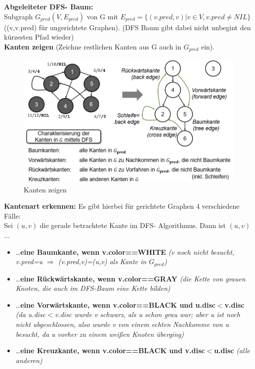 \documentclass{article}
\begin{document}
            \textbf{Abgeleiteter DFS- Baum:}\\
            Subgraph $G_{pred} (V, E_{pred})$ von G mit $E_{pred}=\{(v.pred, v)| v \in V, v.pred \neq NIL \}$ ((v,v.pred) für ungerichtete Graphen). (DFS Baum gibt dabei nicht unbegint den kürzesten Pfad wieder)\\
            \textbf{Kanten zeigen} (Zeichne restlichen Kanten aus G auch in $G_{pred}$ ein).
            \begin{figure}[ht]
                \centering
                \includegraphics[width=1\textwidth]{Bilder/DFSAbg.png}
                \caption{Kanten zeigen}
                \label{fig:DFSAbg}
            \end{figure}
            \newpage
            \textbf{Kantenart erkennen:} Es gibt hierbei für gerichtete Graphen 4 verschiedene Fälle:\\
            Sei $(u,v)$ die gerade betrachtete Kante im DFS- Algorithmus. Dann ist $(u,v)$...
            \begin{itemize}
                \item \dots\textbf{eine Baumkante, wenn v.color==WHITE} \textit{(v noch nicht besucht, v.pred=u $\Rightarrow$ (v.pred,v)=(u,v) als Kante in $G_{pred}$)}
                \item \dots\textbf{eine Rückwärtskante, wenn v.color==GRAY} \textit{(die Kette von grauen Knoten, die auch im DFS-Baum eine Kette bilden)}
                \item \dots\textbf{eine Vorwärtskante, wenn v.color==BLACK und u.disc$<$v.disc} \textit{(da u.disc$<$v.disc wurde v schwarz, als u schon grau war; aber u ist noch nicht abgeschlossen, also wurde v von einem echten Nachkomme von u besucht, da u vorher zu einem weißen Knoten überging)}
                \item \dots\textbf{eine Kreuzkante, wenn v.color==BLACK und v.disc$<$u.disc} \textit{(alle anderen)}
            \end{itemize}
\end{document}
